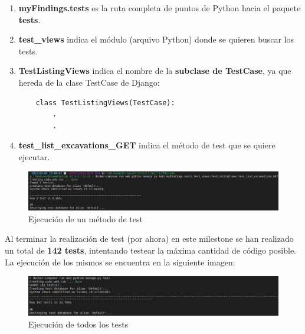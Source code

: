    \begin{enumerate}
        \item \textbf{myFindings.tests} es la ruta completa de puntos de Python hacia el
        paquete \textbf{tests}.
        \item \textbf{test\_views} indica el módulo (arquivo Python) donde se quieren
        buscar los tests.
        \item \textbf{TestListingViews} indica el nombre de la \textbf{subclase de TestCase},
        ya que hereda de la clase TestCase de Django:
    
    \begin{verbatim}
    class TestListingViews(TestCase):
        .
        .
    \end{verbatim}
        \item \textbf{test\_list\_excavations\_GET} indica el método de test que se quiere
        ejecutar.
    \end{enumerate}

    \begin{figure}[H]
        \centering
        \includegraphics[scale=0.27]{imagenes/one-test.png}
        \caption{Ejecución de un método de test}
        \label{fig:one-test}
    \end{figure}

Al terminar la realización de test (por ahora) en este milestone se han realizado un total de
\textbf{142 tests}, intentando testear la máxima cantidad de código posible. La ejecución de
los mismos se encuentra en la siguiente imagen:

    \begin{figure}[H]
        \centering
        \includegraphics[scale=0.30]{imagenes/all-tests.png}
        \caption{Ejecución de todos los tests}
        \label{fig:all-tests}
    \end{figure}


